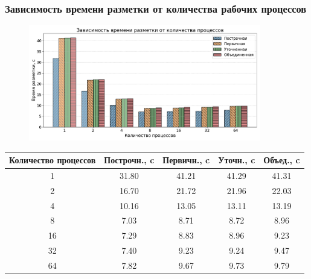 \documentclass[gray]{beamer}
\begin{document}
\begin{frame}
    \frametitle{Зависимость времени разметки от количества рабочих процессов}
    \begin{figure}[H]
        \centering
        \includegraphics[width=0.9\textwidth]{diag/tama_bar.pdf}
    \end{figure}

    \vspace{-0.5cm}
    \tiny
    \begin{center}
        \begin{tabular}{|c|c|c|c|c|}
            \hline
            \textbf{Количество процессов} & \textbf{Построчн.}, c & \textbf{Первичн.}, c & \textbf{Уточн.}, c & \textbf{Объед., c} \\ \hline
            1 & 31.80 & 41.21 & 41.29 & 41.31 \\ \hline
            2 & 16.70 & 21.72 & 21.96 & 22.03 \\ \hline
            4 & 10.16 & 13.05 & 13.11 & 13.19 \\ \hline
            8 & 7.03 & 8.71 & 8.72 & 8.96 \\ \hline
            16 & 7.29 & 8.83 & 8.96 & 9.23 \\ \hline
            32 & 7.40 & 9.23 & 9.24 & 9.47 \\ \hline
            64 & 7.82 & 9.67 & 9.73 & 9.79 \\ \hline
        \end{tabular}
    \end{center}
\end{frame}
\end{document}
